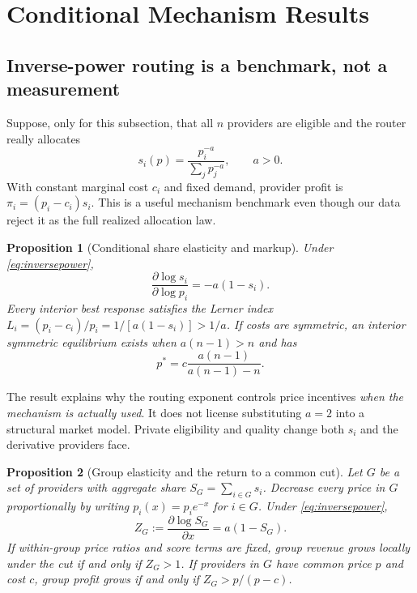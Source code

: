 \documentclass[sigconf,nonacm]{acmart}
\newtheorem{proposition}{Proposition}
\newcommand{\1}{\mathbf 1}
\begin{document}
\section{Conditional Mechanism Results}
\label{sec:theory}

\subsection{Inverse-power routing is a benchmark, not a measurement}

Suppose, only for this subsection, that all $n$ providers are eligible and the
router really allocates
\begin{equation}
s_i(p)=\frac{p_i^{-a}}{\sum_jp_j^{-a}},\qquad a>0.
\label{eq:inversepower}
\end{equation}
With constant marginal cost $c_i$ and fixed demand, provider profit is
$\pi_i=(p_i-c_i)s_i$.  This is a useful mechanism benchmark even though our data
reject it as the full realized allocation law.

\begin{proposition}[Conditional share elasticity and markup]
Under \eqref{eq:inversepower},
\begin{equation}
\frac{\partial\log s_i}{\partial\log p_i}=-a(1-s_i).
\end{equation}
Every interior best response satisfies the Lerner index
$L_i=(p_i-c_i)/p_i=1/[a(1-s_i)]>1/a$.  If costs are symmetric, an interior
symmetric equilibrium exists when $a(n-1)>n$ and has
\begin{equation}
p^*=c\frac{a(n-1)}{a(n-1)-n}.
\end{equation}
\end{proposition}

The result explains why the routing exponent controls price incentives
\emph{when the mechanism is actually used}.  It does not license substituting
$a=2$ into a structural market model.  Private eligibility and quality change
both $s_i$ and the derivative providers face.

\begin{proposition}[Group elasticity and the return to a common cut]
\label{prop:groupelasticity}
Let $G$ be a set of providers with aggregate share $S_G=\sum_{i\in G}s_i$.
Decrease every price in $G$ proportionally by writing
$p_i(x)=p_i e^{-x}$ for $i\in G$.  Under \eqref{eq:inversepower},
\begin{equation}
 Z_G:=\frac{\partial\log S_G}{\partial x}=a(1-S_G).
 \label{eq:groupelasticity}
\end{equation}
If within-group price ratios and score terms are fixed, group revenue grows
locally under the cut if and only if $Z_G>1$.  If providers in $G$ have common
price $p$ and cost $c$, group profit grows if and only if
$Z_G>p/(p-c)$.
\end{proposition}
\end{document}
